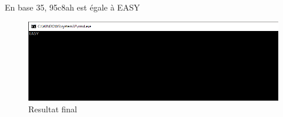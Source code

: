 \documentclass[11pt]{report}
\begin{document}
\medskip

En base 35,  95c8ah est égale à EASY

\begin{figure}[ht]
\includegraphics[width=12cm]{capture6.PNG}
\caption{Resultat final}
\end{figure}
\end{document}
